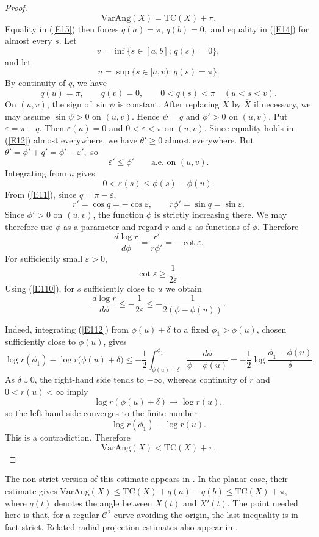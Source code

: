 \documentclass[10pt,a4paper]{amsart}
\newcommand{\T}{\mathrm{TC}}
\newcommand{\VA}{\mathrm{VarAng}}
\newcommand{\cC}{\mathcal{C}}
\def\bar{\overline}
\numberwithin{equation}{section}
\begin{document}
\begin{proof}
\begin{equation}\VA(X)=\T(X)+\pi.
\label{E16}
\end{equation}
Equality in (\ref{E15}) then forces $q(a)=\pi,\,q(b)=0,$
and equality in (\ref{E14}) for almost every $s$. Let
\[v=\inf\{s\in[a,b];\,q(s)=0\},\]
and let
\[u=\sup\{s\in[a,v);\,q(s)=\pi\}.
\]
By continuity of $q$, we have
\begin{equation*} q(u)=\pi,\qquad q(v)=0,\qquad 0<q(s)<\pi \quad (u<s<v).
\end{equation*}
On $(u,v)$, the sign of $\sin\psi$ is constant. After replacing $X$ by $\bar X$ if necessary, we may assume $\sin\psi>0$ on $(u,v)$. Hence $\psi=q$ and $ \phi'>0$ on $(u,v).$ Put $\varepsilon=\pi-q$.
Then $\varepsilon(u)=0$ and  $0<\varepsilon<\pi$ on $(u,v).$
Since equality holds in (\ref{E12}) almost everywhere, we have $\theta'\ge0 $ almost everywhere. But $\theta'=\phi'+q'=\phi'-\varepsilon',$
so
\begin{equation*}
	\varepsilon'\le \phi'\qquad\text{a.e. on }(u,v).
\end{equation*}
Integrating from $u$ gives
\begin{equation}0<\varepsilon(s)\le\phi(s)-\phi(u).
    \label{E110}
\end{equation}
From (\ref{E11}), since $q=\pi-\varepsilon$,
\[r'=\cos q=-\cos\varepsilon,\qquad r\phi'=\sin q=\sin\varepsilon.\]
Since $\phi'>0$ on $(u,v)$, the function $\phi$ is strictly increasing
there. We may therefore use $\phi$ as a parameter and regard $r$ and
$\varepsilon$ as functions of $\phi$. Therefore
\begin{equation}\frac{d\log r}{d\phi}=\frac{r'}{r\phi'}=-\cot\varepsilon.
    \label{E111}
\end{equation}
For sufficiently small $\varepsilon>0$,
\[\cot\varepsilon\ge \frac{1}{2\varepsilon}.\]
Using (\ref{E110}), for $s$ sufficiently close to $u$ we obtain
\begin{equation}\frac{d\log r}{d\phi}\le-\frac{1}{2\varepsilon}\le-\frac{1}{2\left(\phi-\phi(u)\right)}.
    \label{E112}
\end{equation}

Indeed, integrating (\ref{E112}) from $\phi(u)+\delta$ to a fixed
$\phi_1>\phi(u)$, chosen sufficiently close to $\phi(u)$, gives
\[
\log r(\phi_1)-\log r\bigl(\phi(u)+\delta\bigr)
\le
-\frac12
\int_{\phi(u)+\delta}^{\phi_1}
\frac{d\phi}{\phi-\phi(u)}
=
-\frac12
\log\frac{\phi_1-\phi(u)}{\delta}.
\]
As $\delta\downarrow0$, the right-hand side tends to $-\infty$,
whereas continuity of $r$ and $0<r(u)<\infty$ imply
\[
\log r\left(\phi(u)+\delta\right)\longrightarrow \log r(u),
\]
so the left-hand side converges to the finite number
\[\log r(\phi_1)-\log r(u).\]
This is a contradiction. Therefore
\[\VA(X)<\T(X)+\pi.\]
\end{proof}
The non-strict version of this estimate appears in \cite[Theorem~4]{KY}. In the planar case, their estimate gives $\VA(X)\le \T(X)+q(a)-q(b)\le \T(X)+\pi,$ where $q(t)$ denotes the angle between $X(t)$ and $X'(t)$. The point needed here is that, for a regular $\cC^2$ curve avoiding the origin, the last inequality is in fact strict. Related radial-projection estimates also appear in \cite[Section~8]{EWW}.
\end{document}
